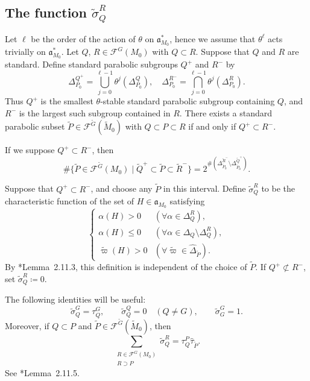\documentclass[12pt]{amsart}
\theoremstyle{definition}
\theoremstyle{plain}
\theoremstyle{remark}
\newcommand{\fa}{\mathfrak{a}}
\newcommand{\cF}{\mathcal{F}}
\numberwithin{equation}{section}
\newcommand{\tG}{\widetilde{G}}
\newcommand{\tM}{\widetilde{M}}
\newcommand{\tP}{\widetilde{P}}
\newcommand{\tQ}{\widetilde{Q}}
\newcommand{\tR}{\widetilde{R}}
\newcommand{\tvarpi}{\widetilde{\varpi}}
\begin{document}
\subsection{The function
             \texorpdfstring{$\widetilde\sigma_Q^R$}{sigma}}


Let $\ell$ be the order of the action of $\theta$ on $\fa_{M_0}^*$, hence we assume that $\theta^\ell$ acts trivially on $\fa_{M_0}^*$.
Let $Q$, $R\in\cF^G(M_0)$ with $Q\subset R$.
Suppose that $Q$ and $R$ are standard.
Define standard parabolic subgroups $Q^+$ and $R^-$ by
\[
  \Delta_{P_0}^{Q^+}=\bigcup_{j=0}^{\ell-1}\theta^j(\Delta_{P_0}^{Q}),
    \quad 
  \Delta_{P_0}^{R^-}=\bigcap_{j=0}^{\ell-1}\theta^j(\Delta_{P_0}^{R}).
\]
Thus $Q^+$ is the smallest $\theta$-stable standard parabolic
subgroup containing $Q$, and $R^-$ is the largest such subgroup
contained in $R$. 
There exists a standard parabolic subset $\tP\in\cF^{\tG}(\tM_0)$ with
$Q\subset P\subset R$ if and only if $Q^+\subset R^-$.

If we suppose $Q^+\subset R^-$, then 
\[
\#\{ \tP\in \cF^{\tG}(M_0) \mid \tQ^+\subset\tP\subset\tR^-  \}=2^{\#(\Delta_{\tP_0}^{\tR^-}\setminus \Delta_{\tP_0}^{\tQ^+})}.
\]
\fi



Suppose that $Q^+\subset R^-$, and choose any
$\tP$ in this interval.
Define $\widetilde\sigma_Q^R$ to be the characteristic
function of the set of $H\in\fa_{M_0}$ satisfying
\[
\begin{cases}
  \alpha(H)>0
    &(\forall\alpha\in\Delta_Q^R),\\
  \alpha(H)\leq0
    &(\forall\alpha\in\Delta_Q\setminus\Delta_Q^R),\\
  \tvarpi(H)>0
    &(\forall\tvarpi\in\widehat\Delta_{\tP}).
\end{cases}
\]
By \cite{LW13}*{Lemma~2.11.3}, this definition is independent of the choice of $\tP$.
If $Q^+\not\subset R^-$, set $\widetilde\sigma_Q^R\coloneqq 0$.


The following identities will be useful:
\[
  \widetilde\sigma_Q^G=\tau_Q^G,
  \qquad \widetilde\sigma_Q^Q=0\quad(Q\neq G),
  \qquad \widetilde\sigma_G^G=1.
\]
Moreover, if $Q\subset P$ and $\tP\in\cF^{\tG}(\tM_0)$, then
\begin{equation}
  \sum_{\substack{R\in\cF^G(M_0) \\ R\supset P}}\widetilde\sigma_Q^R
      =\tau_Q^P\widehat\tau_{\tP}.
  \label{eq:lw911-sigma-identity}
\end{equation}
See \cite{LW13}*{Lemma~2.11.5}.
\end{document}
